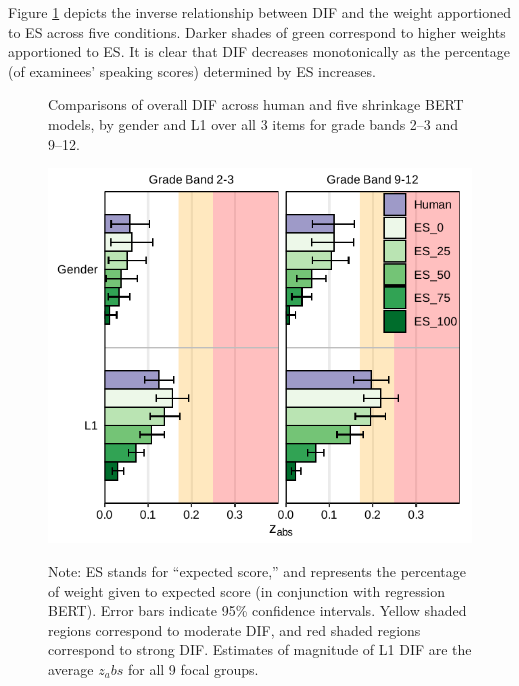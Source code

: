 \documentclass [PhD] {uclathes}
\begin{document}
Figure \ref{fig:shrinkBERT_zabs_ovr} depicts the inverse relationship between DIF and the weight apportioned to ES across five conditions. Darker shades of green correspond to higher weights apportioned to ES. It is clear that DIF decreases monotonically as the percentage (of examinees’ speaking scores) determined by ES increases. 

\begin{figure}[!htb]
    \centering
    \caption{Comparisons of overall DIF across human and five shrinkage BERT models, by gender and L1 over all 3 items for grade bands 2–3 and 9–12.}    
    \includegraphics[width=4.5in]{figures/20230425_ETS-DIF_ES_zabs_ovr_edit.pdf}
    \label{fig:shrinkBERT_zabs_ovr}
\caption*{\small Note: ES stands for “expected score,” and represents the percentage of weight given to expected score (in conjunction with regression BERT). Error bars indicate 95\% confidence intervals. Yellow shaded regions correspond to moderate DIF, and red shaded regions correspond to strong DIF. Estimates of magnitude of L1 DIF are the average $z_abs$ for all 9 focal groups.}
\end{figure}
\end{document}
